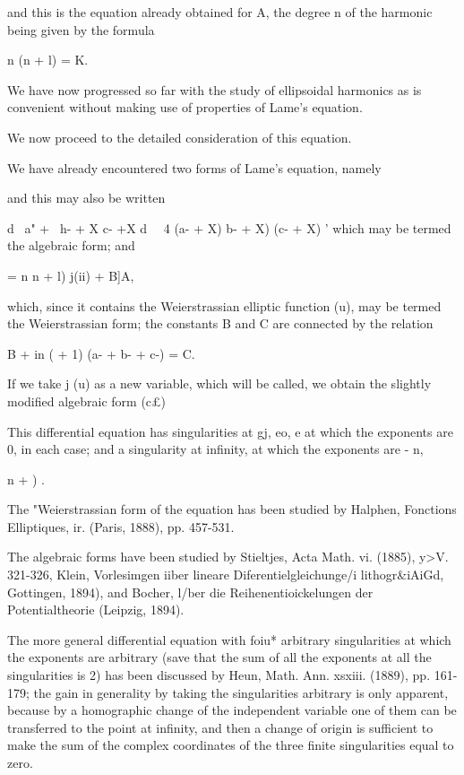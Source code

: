 {{{and this is the equation already obtained for A, the degree n of the
harmonic being given by the formula

n (n + l) = K.

We have now progressed so far with the study of ellipsoidal harmonics
as is convenient without making use of properties of Lame's equation.

We now proceed to the detailed consideration of this equation.


We have already encountered two forms of Lame's equation, namely

and this may also be written

d \ a" + \ h- + X c- +X d\ ~ 4 (a- + X) b- + X) (c- + X) ' which may
be termed the algebraic form; and

  = n n + l) j(ii) + B]A,

which, since it contains the Weierstrassian elliptic function (u), may
be termed the Weierstrassian form; the constants B and C are
connected by the relation

B + in ( + 1) (a- + b- + c-) = C.

%
%

If we take j (u) as a new variable, which will be called, we obtain
the slightly modified algebraic form (c£)

This differential equation has singularities at gj, eo, e at which the
exponents are 0, in each case; and a singularity at infinity, at
which the exponents are - n,\ \ {n + ) .

The "Weierstrassian form of the equation has been studied by Halphen,
Fonctions Elliptiques, ir. (Paris, 1888), pp. 457-531.

The algebraic forms have been studied by Stieltjes, Acta Math. vi.
(1885), y>V. 321-326, Klein, Vorlesimgen iiber lineare
Diferentielgleichunge/i lithogr\&iAiGd, Gottingen, 1894), and Bocher,
l/ber die Reihenentioickelungen der Potentialtheorie (Leipzig, 1894).

The more general differential equation with foiu* arbitrary
singularities at which the exponents are arbitrary (save that the sum
of all the exponents at all the singularities is 2) has been discussed
by Heun, Math. Ann. xsxiii. (1889), pp. 161-179; the gain in
generality by taking the singularities arbitrary is only apparent,
because by a homographic change of the independent variable one of
them can be transferred to the point at infinity, and then a change of
origin is sufficient to make the sum of the complex coordinates of the
three finite singularities equal to zero.

}}}}
